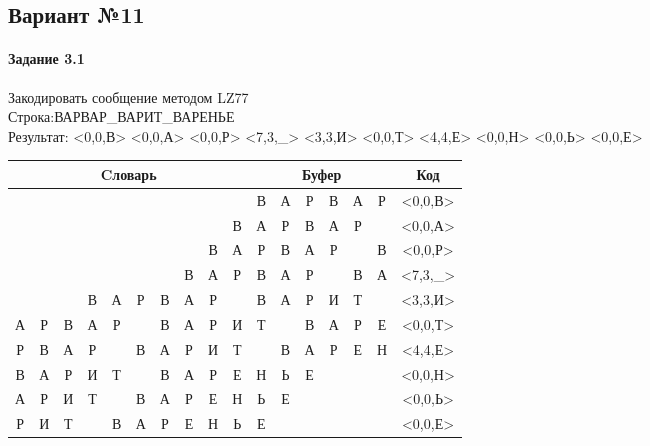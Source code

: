 \documentclass[a4paper, 12pt]{article}
\begin{document}
\pagebreak
\subsection{Вариант №11}
\paragraph{Задание 3.1}

Закодировать сообщение методом LZ77\\
Строка:ВАРВАР\_ВАРИТ\_ВАРЕНЬЕ\\
Результат: <0,0,В> <0,0,А> <0,0,Р> <7,3,\_> <3,3,И> <0,0,Т> <4,4,Е> <0,0,Н> <0,0,Ь> <0,0,Е>\\
\begin{table}[h!]
\centering
\begin{tabular}{|c|c|c|c|c|c|c|c|c|c|c|c|c|c|c|c|c|} 
\hline
\multicolumn{10}{|c|}{Cловарь} & \multicolumn{6}{c|}{Буфер} & Код  \\ \hline
  &   &   &   &   &   &   &   &   &   & \cellcolor[HTML]{8CE4F6} В & А & Р & В & А & Р & <0,0,В>
\\ \hline
  &   &   &   &   &   &   &   &   & В & \cellcolor[HTML]{8CE4F6} А & Р & В & А & Р &   & <0,0,А>
\\ \hline
  &   &   &   &   &   &   &   & В & А & \cellcolor[HTML]{8CE4F6} Р & В & А & Р &   & В & <0,0,Р>
\\ \hline
  &   &   &   &   &   &   & \cellcolor[HTML]{FFFF00} В & \cellcolor[HTML]{FFFF00} А & \cellcolor[HTML]{FFFF00} Р & \cellcolor[HTML]{FFFF00} В & \cellcolor[HTML]{FFFF00} А & \cellcolor[HTML]{FFFF00} Р & \cellcolor[HTML]{8CE4F6}   & В & А & <7,3,\_>
\\ \hline
  &   &   & \cellcolor[HTML]{FFFF00} В & \cellcolor[HTML]{FFFF00} А & \cellcolor[HTML]{FFFF00} Р & В & А & Р &   & \cellcolor[HTML]{FFFF00} В & \cellcolor[HTML]{FFFF00} А & \cellcolor[HTML]{FFFF00} Р & \cellcolor[HTML]{8CE4F6} И & Т &   & <3,3,И>
\\ \hline
А & Р & В & А & Р &   & В & А & Р & И & \cellcolor[HTML]{8CE4F6} Т &   & В & А & Р & Е & <0,0,Т>
\\ \hline
Р & В & А & Р & \cellcolor[HTML]{FFFF00}   & \cellcolor[HTML]{FFFF00} В & \cellcolor[HTML]{FFFF00} А & \cellcolor[HTML]{FFFF00} Р & И & Т & \cellcolor[HTML]{FFFF00}   & \cellcolor[HTML]{FFFF00} В & \cellcolor[HTML]{FFFF00} А & \cellcolor[HTML]{FFFF00} Р & \cellcolor[HTML]{8CE4F6} Е & Н & <4,4,Е>
\\ \hline
В & А & Р & И & Т &   & В & А & Р & Е & \cellcolor[HTML]{8CE4F6} Н & Ь & Е &   &   &   & <0,0,Н>
\\ \hline
А & Р & И & Т &   & В & А & Р & Е & Н & \cellcolor[HTML]{8CE4F6} Ь & Е &   &   &   &   & <0,0,Ь>
\\ \hline
Р & И & Т &   & В & А & Р & Е & Н & Ь & \cellcolor[HTML]{8CE4F6} Е &   &   &   &   &   & <0,0,Е>
\\ \hline
\end{tabular}
\end{table}
\end{document}
